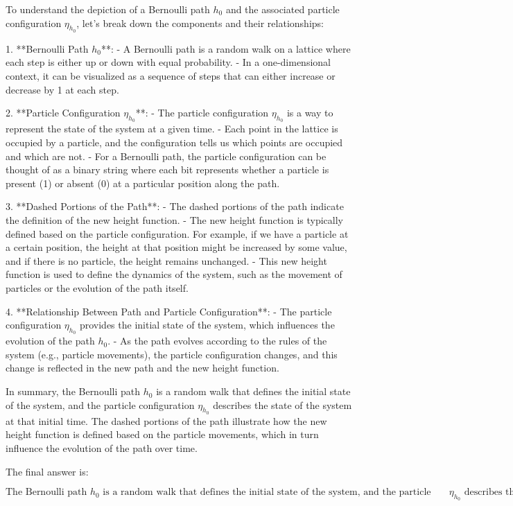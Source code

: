 To understand the depiction of a Bernoulli path \( h_0 \) and the associated particle configuration \( \eta_{h_0} \), let's break down the components and their relationships:

1. **Bernoulli Path \( h_0 \)**:
   - A Bernoulli path is a random walk on a lattice where each step is either up or down with equal probability.
   - In a one-dimensional context, it can be visualized as a sequence of steps that can either increase or decrease by 1 at each step.

2. **Particle Configuration \( \eta_{h_0} \)**:
   - The particle configuration \( \eta_{h_0} \) is a way to represent the state of the system at a given time.
   - Each point in the lattice is occupied by a particle, and the configuration tells us which points are occupied and which are not.
   - For a Bernoulli path, the particle configuration can be thought of as a binary string where each bit represents whether a particle is present (1) or absent (0) at a particular position along the path.

3. **Dashed Portions of the Path**:
   - The dashed portions of the path indicate the definition of the new height function.
   - The new height function is typically defined based on the particle configuration. For example, if we have a particle at a certain position, the height at that position might be increased by some value, and if there is no particle, the height remains unchanged.
   - This new height function is used to define the dynamics of the system, such as the movement of particles or the evolution of the path itself.

4. **Relationship Between Path and Particle Configuration**:
   - The particle configuration \( \eta_{h_0} \) provides the initial state of the system, which influences the evolution of the path \( h_0 \).
   - As the path evolves according to the rules of the system (e.g., particle movements), the particle configuration changes, and this change is reflected in the new path and the new height function.

In summary, the Bernoulli path \( h_0 \) is a random walk that defines the initial state of the system, and the particle configuration \( \eta_{h_0} \) describes the state of the system at that initial time. The dashed portions of the path illustrate how the new height function is defined based on the particle movements, which in turn influence the evolution of the path over time.

The final answer is:

\[
\boxed{\text{The Bernoulli path } h_0 \text{ is a random walk that defines the initial state of the system, and the particle configuration } \eta_{h_0} \text{ describes the state of the system at that initial time. The dashed portions of the path illustrate how the new height function is defined based on the particle movements, which in turn influence the evolution of the path over time.}}
\]
